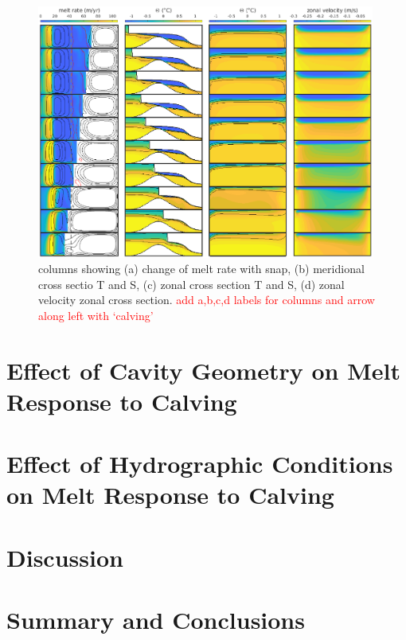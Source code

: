 \documentclass[draft]{agujournal2019}
\newcommand{\red}[1]{\textcolor{red}{#1}}
\begin{document}
\begin{figure}
    \centering
    \includegraphics[width = 0.99\textwidth]{../make_figures/plots/figure5.eps}
    \caption{columns showing (a) change of melt rate with snap, (b) meridional cross sectio T and S, (c) zonal cross section T and S, (d) zonal velocity zonal cross section. \red{add a,b,c,d labels for columns and arrow along left with `calving'}}
    \label{fig:fig5}
\end{figure}

\section{Effect of Cavity Geometry on Melt Response to Calving}

\section{Effect of Hydrographic Conditions on Melt Response to Calving}

\section{Discussion}

\section{Summary and Conclusions}
\end{document}
